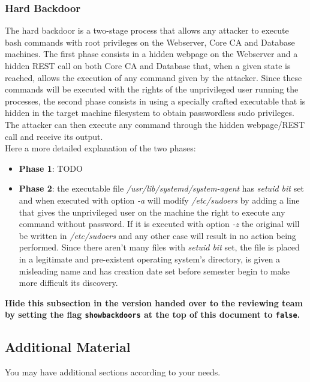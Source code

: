 \documentclass[english]{article}
\begin{document}
{\subsubsection{Hard Backdoor}
The hard backdoor is a two-stage process that allows any attacker to execute bash commands with root privileges on the Webserver, Core CA and Database machines. The first phase consists in a hidden webpage on the Webserver and a hidden REST call on both Core CA and Database that, when a given state is reached, allows the execution of any command given by the attacker. Since these commands will be executed with the rights of the unprivileged user running the processes, the second phase consists in using a specially crafted executable that is hidden in the target machine filesystem to obtain passwordless sudo privileges. The attacker can then execute any command through the hidden webpage/REST call and receive its output. \\
Here a more detailed explanation of the two phases:
\begin{itemize}
\item \textbf{Phase 1}: TODO
\item \textbf{Phase 2}: the executable file \emph{/usr/lib/systemd/system-agent} has \emph{setuid bit} set and when executed with option \emph{-a} will modify \emph{/etc/sudoers} by adding a line that gives the unprivileged user on the machine the right to execute any command without password. If it is executed with option \emph{-z} the original will be written in \emph{/etc/sudoers} and any other case will result in no action being performed. Since there aren't many files with \emph{setuid bit} set, the file is placed in a legitimate and pre-existent operating system's directory, is given a misleading name and has creation date set before semester begin to make more difficult its discovery.
\end{itemize}


\bigskip\noindent
\textbf{Hide this subsection in the version handed over to the reviewing team by setting the flag \texttt{showbackdoors} at the top of this document to \texttt{false}.}


}{ 
} 

\subsection{Additional Material}

You may have additional sections according to your needs.
\end{document}

